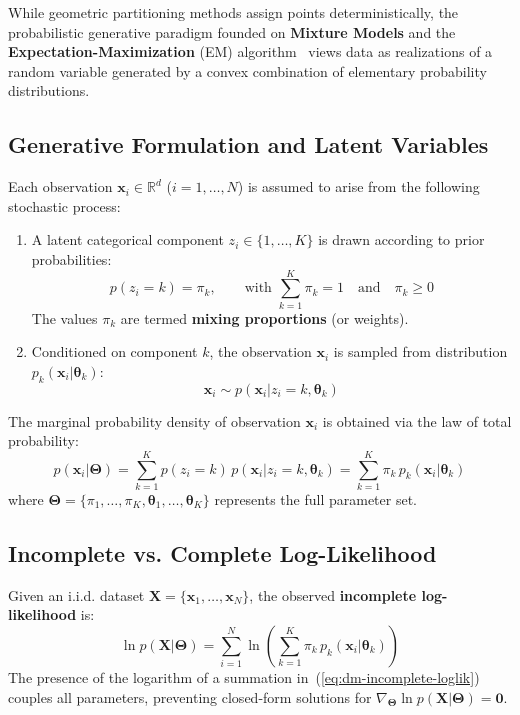 While geometric partitioning methods assign points deterministically, the probabilistic generative paradigm founded on \textbf{Mixture Models} and the \textbf{Expectation-Maximization} (EM) algorithm~\cite{dempster1977} views data as realizations of a random variable generated by a convex combination of elementary probability distributions.

\subsection{Generative Formulation and Latent Variables}

Each observation $\mathbf{x}_i \in \mathbb{R}^d$ ($i = 1, \dots, N$) is assumed to arise from the following stochastic process:
\begin{enumerate}
    \item A latent categorical component $z_i \in \{1, \dots, K\}$ is drawn according to prior probabilities:
    \begin{equation}
    p(z_i = k) = \pi_k, \qquad \text{with } \sum_{k=1}^K \pi_k = 1 \quad \text{and} \quad \pi_k \ge 0
    \end{equation}
    The values $\pi_k$ are termed \textbf{mixing proportions} (or weights).
    \item Conditioned on component $k$, the observation $\mathbf{x}_i$ is sampled from distribution $p_k(\mathbf{x}_i | \boldsymbol{\theta}_k)$:
    \begin{equation}
    \mathbf{x}_i \sim p(\mathbf{x}_i | z_i = k, \boldsymbol{\theta}_k)
    \end{equation}
\end{enumerate}
The marginal probability density of observation $\mathbf{x}_i$ is obtained via the law of total probability:
\begin{equation}
\label{eq:dm-mixture-marginal-density}
p(\mathbf{x}_i | \boldsymbol{\Theta}) = \sum_{k=1}^K p(z_i = k) \, p(\mathbf{x}_i | z_i = k, \boldsymbol{\theta}_k) = \sum_{k=1}^K \pi_k \, p_k(\mathbf{x}_i | \boldsymbol{\theta}_k)
\end{equation}
where $\boldsymbol{\Theta} = \{\pi_1, \dots, \pi_K, \boldsymbol{\theta}_1, \dots, \boldsymbol{\theta}_K\}$ represents the full parameter set.

\subsection{Incomplete vs. Complete Log-Likelihood}

Given an i.i.d. dataset $\mathbf{X} = \{\mathbf{x}_1, \dots, \mathbf{x}_N\}$, the observed \textbf{incomplete log-likelihood} is:
\begin{equation}
\label{eq:dm-incomplete-loglik}
\ln p(\mathbf{X} | \boldsymbol{\Theta}) = \sum_{i=1}^N \ln \left( \sum_{k=1}^K \pi_k \, p_k(\mathbf{x}_i | \boldsymbol{\theta}_k) \right)
\end{equation}
The presence of the logarithm of a summation in~(\ref{eq:dm-incomplete-loglik}) couples all parameters, preventing closed-form solutions for $\nabla_{\boldsymbol{\Theta}} \ln p(\mathbf{X} | \boldsymbol{\Theta}) = \mathbf{0}$.

